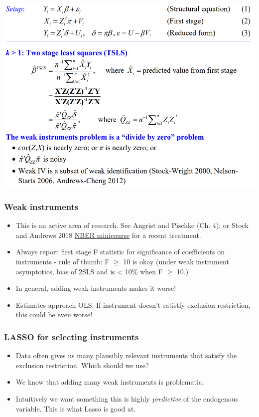 \begin{frame}{}
  \begin{center}
    \includegraphics[height=.8\textheight]{./resources/StockNBER2sls}
  \end{center}  
\end{frame}


\begin{frame}
  \frametitle{Weak instruments}
  \begin{itemize}
    \item This is an active area of research. See Angrist and Pischke (Ch. 4); or Stock and Andrews 2018 \href{https://www.nber.org/econometrics_minicourse_2018/}{NBER minicourse} for a recent treatment. 
    \item Always report first stage F statistic for significance of
    coefficients on instruments - rule of thumb: F $\ge$ 10 is
    okay (under weak instrument asymptotics, bias
    of 2SLS and is < 10\% when F $\ge$ 10.)
    \item In general, adding weak instruments makes it worse! 
    \item Estimates approach OLS. If instrument doesn't satistfy exclusion restriction, this could be even worse!
   \end{itemize}
\end{frame}

\begin{frame}
  \frametitle{LASSO for selecting instruments}
  \begin{itemize}
    \item Data often gives us many plausibly relevant instruments that satisfy the exclusion restriction. Which should we use?
    \item We know that adding many weak instruments is problematic. 
    \item Intuitively we want something this is highly \textit{predictive} of the endogenous variable. This is what Lasso is good at. \citep{belloni2012sparse}
   \end{itemize}
\end{frame}

